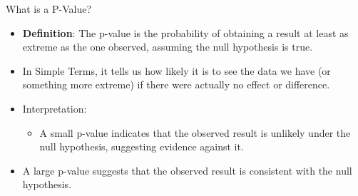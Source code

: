 \documentclass[
  ignorenonframetext,
]{beamer}
\providecommand{\tightlist}{%
  \setlength{\itemsep}{0pt}\setlength{\parskip}{0pt}}
\begin{document}
\begin{frame}{What is a P-Value?}
\label{what-is-a-p-value}
\begin{itemize}
\tightlist
\item
  \textbf{Definition}: The p-value is the probability of obtaining a
  result at least as extreme as the one observed, assuming the null
  hypothesis is true.
\end{itemize}

\begin{itemize}
\tightlist
\item
  In Simple Terms, it tells us how likely it is to see the data we have
  (or something more extreme) if there were actually no effect or
  difference.
\end{itemize}

\begin{itemize}
\item
  Interpretation:

  \begin{itemize}
  \tightlist
  \item
    A small p-value indicates that the observed result is unlikely under
    the null hypothesis, suggesting evidence against it.
  \end{itemize}
\end{itemize}

\begin{itemize}
\tightlist
\item
  A large p-value suggests that the observed result is consistent with
  the null hypothesis.
\end{itemize}
\end{frame}

\begin{frame}{}
\label{section}
\end{frame}
\end{document}
